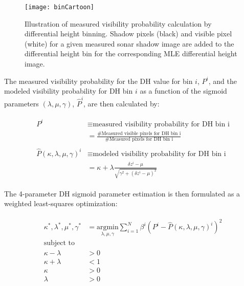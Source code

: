 \begin{figure}[!h]
	\centering
		\texttt{[image: binCartoon]}
	\caption{Illustration of measured visibility probability calculation by differential height binning.  Shadow pixels (black) and visible pixel (white) for a given measured sonar shadow image are added to the differential height bin for the corresponding MLE differential height image. }
	\label{fig:binCartoon}
\end{figure}

The measured visibility probability for the DH value for bin $i$, $P^i$, and the modeled visibility probability for DH bin $i$ as a function of the sigmoid parameters $(\lambda, \mu, \gamma)$, $\hat{P}^i$, are then calculated by:

\begin{align}
\begin{split}
P^i &\equiv \text{measured visibility probability for DH bin i} \\
&= \frac{\text{\# Measured visible pixels for DH bin i}}{ \text{\# Measured pixels for DH bin i}} \\
\\
\hat{P}(\kappa, \lambda, \mu, \gamma)^i &\equiv \text{modeled visibility probability for DH bin i} \\
&= \kappa + \lambda \frac{\delta z^{i} - \mu}{\sqrt{\gamma^2 + (\delta z^{i} - \mu)^2}} 
\label{eq:measMLEprobs}
\end{split}
\end{align}

The 4-parameter DH sigmoid parameter estimation is then formulated as a weighted least-squares optimization:

\begin{align}
\begin{split} 
\kappa^*, \lambda^*, \mu^*, \gamma^* &= \underset{\lambda, \mu, \gamma}{\text{argmin}} \sum_{i=1}^{N} \beta^i (P^{i} - \hat{P}(\kappa, \lambda, \mu, \gamma)^{i})^2 \\
\text{subject to}& \\
\kappa - \lambda &> 0 \\
\kappa + \lambda &< 1 \\
\kappa &> 0 \\
\lambda &> 0 
\label{eq:opt}
\end{split}
\end{align}

